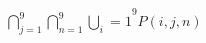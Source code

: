 \documentclass[preview]{standalone}
\begin{document}
\begin{align*}
{\bigcap_{j=1}^{9}\bigcap_{n=1}^{9}\bigcup_i=1}^{9} P(i,j,n)
\end{align*}
\end{document}
